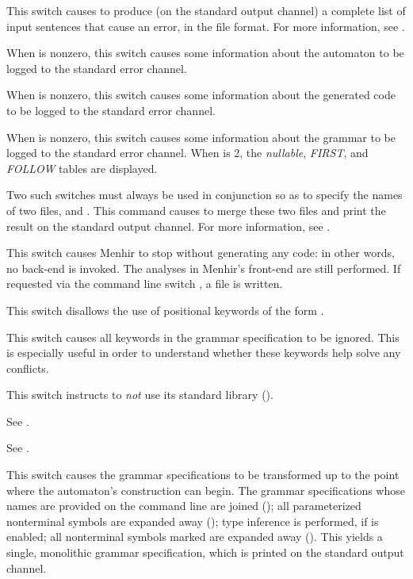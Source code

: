 \documentclass[onecolumn,11pt,nocopyrightspace,preprint]{sigplanconf}
\begin{document}
\docswitch{\olisterrors} This switch causes \menhir to produce (on the standard
output channel) a complete list of input sentences that cause an error, in the
\messages file format. For more information, see .

 When  is nonzero, this switch
causes some information about the automaton to be logged to the standard error
channel.

 When  is nonzero, this switch
causes some information about the generated \ocaml code to be logged to the
standard error channel.

 When  is nonzero, this switch
causes some information about the grammar to be logged to the standard error
channel. When  is 2, the \emph{nullable}, \emph{FIRST}, and
\emph{FOLLOW} tables are displayed.

 Two such
switches must always be used in conjunction so as to specify the names of two
\messages files,  and . This command causes
\menhir to merge these two \messages files and print the result on the
standard output channel. For more information, see .

\docswitch{\onocodegeneration} This switch causes Menhir to stop without
generating any code: in other words, no back-end is invoked. The analyses in
Menhir's front-end are still performed. If requested via the command line
switch \ocmly, a \cmly file is written.

\docswitch{\onodollars} This switch disallows the use of positional keywords
of the form .

\docswitch{\onoinline} This switch causes all \dinline keywords in the
grammar specification to be ignored. This is especially useful in order
to understand whether these keywords help solve any conflicts.

\docswitch{\onostdlib} This switch instructs \menhir to \emph{not} use
its standard library ().

 See .

 See .

\docswitch{\oonlypreprocess} This switch causes the grammar specifications
to be transformed up to the point where the automaton's construction can
begin. The grammar specifications whose names are provided on the command line
are joined (); all parameterized nonterminal symbols are
expanded away (); type inference is performed, if \oinfer
is enabled; all nonterminal symbols marked \dinline are expanded away
(). This yields a single, monolithic grammar specification,
which is printed on the standard output channel.
\end{document}
